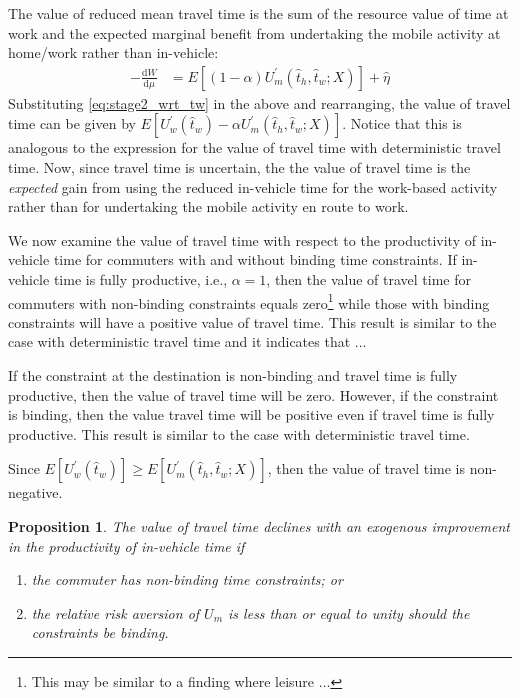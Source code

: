 \documentclass[12pt,a4paper,british]{article}
\newtheorem{prop}{Proposition}[section]
\begin{document}
The value of reduced mean travel time is the sum of the resource value of time at work and the expected marginal benefit from undertaking the mobile activity at home/work rather than in-vehicle:
\begin{align}
-\frac{\mathrm{d}W}{\mathrm{d}\mu} & = E\left[ \left( 1 - \alpha\right) U_m^{\prime} \left(\hat{t}_{h}, \hat{t}_{w}; X \right) \right] + \hat{\eta}
\label{eq:VOT_stochastic}
\end{align}
Substituting \eqref{eq:stage2_wrt_tw} in the above and rearranging, the value of travel time can be given by $E\left[ U_{w}^{\prime}\left( \hat{t}_{w} \right) - \alpha U_{m}^{\prime}\left(\hat{t}_{h}, \hat{t}_{w}; X\right)\right]$.  Notice that this is analogous to the expression for the value of travel time with deterministic travel time. Now, since travel time is uncertain, the the value of travel time is the \textit{expected} gain from using the reduced in-vehicle time for the work-based activity rather than for undertaking the mobile activity en route to work.

We now examine the value of travel time with respect to the productivity of in-vehicle time for commuters with and without binding time constraints. If in-vehicle time is fully productive, i.e., $\alpha=1$,  then the value of travel time for commuters with non-binding constraints equals zero\footnote{This may be similar to a finding where leisure ... } while those with binding constraints will have a positive value of travel time. This result is similar to the case with deterministic travel time and it indicates that ...

If the constraint at the destination is non-binding and travel time is fully productive, then the value of travel time will be zero. However, if the constraint is binding, then the value travel time will be positive even if travel time is fully productive. This result is similar to the case with deterministic travel time.

Since $E\left[U_{w}^{\prime}\left(\hat{t}_{w}\right)\right] \geq E\left[U_{m}^{\prime} \left( \hat{t}_{h}, \hat{t}_{w}; X\right)\right]$, then the value of travel time is non-negative.

\begin{prop}
The value of travel time declines with an exogenous improvement in the productivity of in-vehicle time if
\begin{enumerate}
\item the commuter has non-binding time constraints; or
\item the relative risk aversion of $U_m$ is less than or equal to unity should the constraints be binding.
\end{enumerate}
\end{prop}
\end{document}
